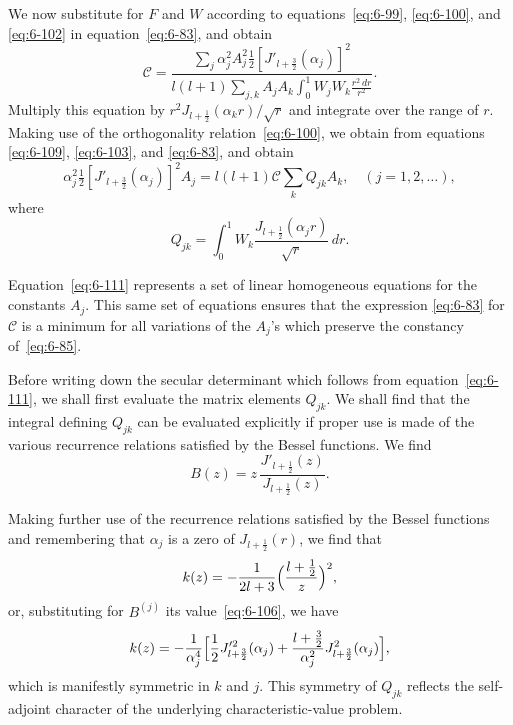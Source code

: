 We now substitute for $F$ and $W$ according to equations~\eqref{eq:6-99}, \eqref{eq:6-100}, and
\eqref{eq:6-102} in equation~\eqref{eq:6-83}, and obtain
\begin{equation}\label{eq:6-109}
\mathcal{C} = \frac{\displaystyle\sum_j \alpha_j^2 A_j^2 \tfrac{1}{2}[J'_{l+\frac{3}{2}}(\alpha_j)]^2}{\displaystyle l(l+1)\sum_{j,k}A_j A_k\int_0^1 W_j W_k \frac{r^2\,dr}{r^2}}.
\end{equation}
Multiply this equation by $r^2 J_{l+\frac{1}{2}}(\alpha_k r)/\sqrt{r}$ and integrate over the range of $r$.
Making use of the orthogonality relation~\eqref{eq:6-100}, we obtain from equations
\eqref{eq:6-109}, \eqref{eq:6-103}, and \eqref{eq:6-83}, and obtain
\begin{equation}\label{eq:6-111}
\alpha_j^2 \tfrac{1}{2}[J'_{l+\frac{3}{2}}(\alpha_j)]^2 A_j = l(l+1)\mathcal{C}\sum_k Q_{jk} A_k, \quad(j=1,2,\ldots),
\end{equation}
where
\begin{equation}\label{eq:6-112}
Q_{jk} = \int_0^1 W_k \frac{J_{l+\frac{1}{2}}(\alpha_j r)}{\sqrt{r}}\,dr.
\end{equation}

Equation~\eqref{eq:6-111} represents a set of linear homogeneous equations for
the constants $A_j$. This same set of equations ensures that the expression
\eqref{eq:6-83} for $\mathcal{C}$ is a minimum for all variations of the $A_j$'s which preserve the
constancy of~\eqref{eq:6-85}.

Before writing down the secular determinant which follows from equa\-tion~\eqref{eq:6-111}, we shall first evaluate the matrix elements $Q_{jk}$. We shall find
that the integral defining $Q_{jk}$ can be evaluated explicitly if proper use is
made of the various recurrence relations satisfied by the Bessel functions.
We find
\begin{equation}\label{eq:6-113}
B(z) = z\,\frac{J'_{l+\frac{1}{2}}(z)}{J_{l+\frac{1}{2}}(z)}.
\end{equation}

Making further use of the recurrence relations satisfied by the Bessel
functions and remembering that $\alpha_j$ is a zero of $J_{l+\frac{1}{2}}(r)$, we find that
\begin{equation}\label{eq:6-114}
k(z) = -\frac{1}{2l+3}\Bigl(\frac{l+\frac{1}{2}}{z}\Bigr)^2,
\end{equation}
or, substituting for $B^{(j)}$ its value~\eqref{eq:6-106}, we have
\begin{equation}\label{eq:6-115}
k(z) = -\frac{1}{\alpha_j^4}\Bigl[\frac{1}{2}J'^2_{l+\frac{3}{2}}(\alpha_j) + \frac{l+\frac{3}{2}}{\alpha_j^2}J^2_{l+\frac{3}{2}}(\alpha_j)\Bigr],
\end{equation}
which is manifestly symmetric in $k$ and $j$. This symmetry of $Q_{jk}$ reflects
the self-adjoint character of the underlying characteristic-value problem.

